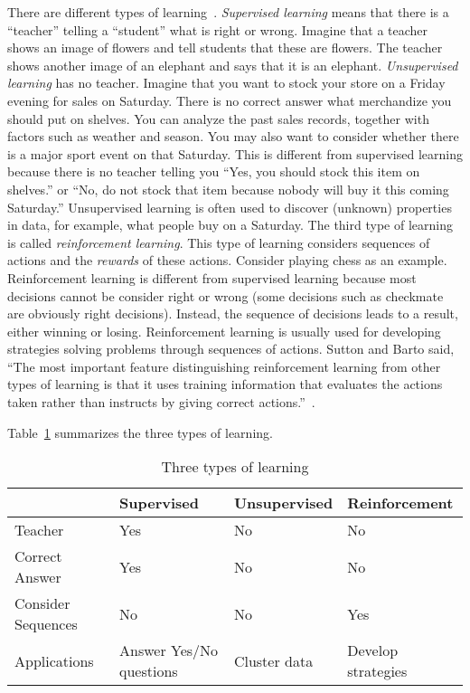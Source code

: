 
There are different types of
learning~\cite{Goodfellow2016DeepLearning,
  Sutton2017ReinforcementLearningIntroduction}.  {\it Supervised
  learning} means that there is a ``teacher'' telling a ``student''
what is right or wrong. Imagine that a teacher shows an image of
flowers and tell students that these are flowers. The teacher shows
another image of an elephant and says that it is an elephant.  {\it
  Unsupervised learning} has no teacher. Imagine that you want to
stock your store on a Friday evening for sales on Saturday.  There is
no correct answer what merchandize you should put on shelves.  You can
analyze the past sales records, together with factors such as weather
and season.  You may also want to consider whether there is a major
sport event on that Saturday.  This is different from supervised
learning because there is no teacher telling you ``Yes, you should
stock this item on shelves.''  or ``No, do not stock that item because
nobody will buy it this coming Saturday.''  Unsupervised learning is
often used to discover (unknown) properties in data, for example, what
people buy on a Saturday.  The third type of learning is called {\it
  reinforcement learning}.  This type of learning considers sequences
of actions and the {\it rewards} of these actions.  Consider playing
chess as an example.  Reinforcement learning is different from
supervised learning because most decisions cannot be consider right or
wrong (some decisions such as checkmate are obviously right
decisions). Instead, the sequence of decisions leads to a result,
either winning or losing. Reinforcement learning is usually used for
developing strategies solving problems through sequences of actions.
Sutton and Barto said, ``The most important feature distinguishing
reinforcement learning from other types of learning is that it uses
training information that evaluates the actions taken rather than
instructs by giving correct
actions.''~\cite{Sutton2017ReinforcementLearningIntroduction}.


Table~\ref{table:threetypesoflearning} summarizes the three types of
learning.

\vspace{0.1in}
\begin{table}
  \begin{tabular}{p{1.2in}p{1.2in}p{1.2in}p{1.2in}}
    &    {\bf Supervised} & {\bf Unsupervised} & {\bf Reinforcement} \\
    \hline
    Teacher & Yes & No & No \\
    Correct Answer & Yes & No & No \\
    Consider Sequences & No & No & Yes \\
    Applications & Answer Yes/No questions & Cluster data & Develop strategies \\
  \end{tabular}
  \caption{Three types of learning}
  \label{table:threetypesoflearning}
\end{table}
\vspace{0.1in}

